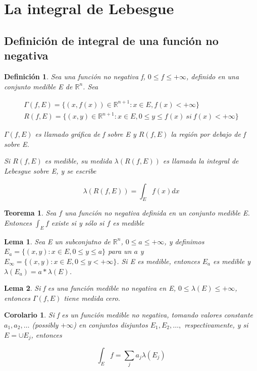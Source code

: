\documentclass{article}
\newtheorem{theorem}{Teorema}
\newtheorem{corollary}{Corolario}
\newtheorem{lemma}{Lema}
\newtheorem{definition}{Definición}
\begin{document}
\section{La integral de Lebesgue}
\subsection{Definición de integral de una función no negativa}
\begin{definition}
Sea una función no negativa f, $0 \leq f \leq +\infty$, definido en una conjunto medible E de $\mathbb{R}^n$. Sea 

\begin{equation*}
\begin{split}
\Gamma(f, E) = \{(x,f(x)) \in \mathbb{R}^{n+1}: x \in E, f(x) < +\infty\} \\
R(f,E)= \{(x,y) \in \mathbb{R}^{n+1}: x\in E, 0 \leq y \leq f(x) \> si \> f(x) < +\infty\}
\end{split}
\end{equation*}

$\Gamma(f,E)$ es llamado gráfica de f sobre E y $R(f,E)$ la región por debajo de f sobre E. 

Si $R(f,E)$ es medible, su medida $\lambda(R(f,E))$ es llamada la integral de Lebesgue sobre E, y se escribe 

\begin{equation}
\lambda(R(f,E)) = \int_E f(x) dx
\end{equation}
\end{definition}

\begin{theorem}
Sea $f$ una función no negativa definida en un conjunto medible E. Entonces $\int_E f$ existe si y sólo si $f$ es medible
\end{theorem}

\begin{lemma}
Sea E un subconjutno de $\mathbb{R}^n$, $0 \leq a \leq +\infty$, y definimos $E_a = \{(x,y): x \in E, 0 \leq y \leq a\}$ para un $a$ y $E_\infty = \{(x,y): x\in E, 0 \leq y < +\infty\}$. Si E es medible, entonces $E_a$ es medible y $\lambda(E_a) = a*\lambda(E)$.
\end{lemma}

\begin{lemma}
Si f es una función medible no negativa en E, $0 \leq \lambda(E) \leq +\infty$, entonces $\Gamma(f,E)$ tiene medida cero.
\end{lemma}

\begin{corollary}
Si f es un función medible no negativa, tomando valores constante $a_1, a_2, \ldots$ (possibly $+\infty$) en conjuntos disjuntos $E_1,E_2,\ldots,$ respectivamente, y si $E =\cup E_j$, entonces

\begin{equation}
\int_E f = \sum_j a_j\lambda(E_j)
\end{equation}
\end{corollary}
\end{document}
